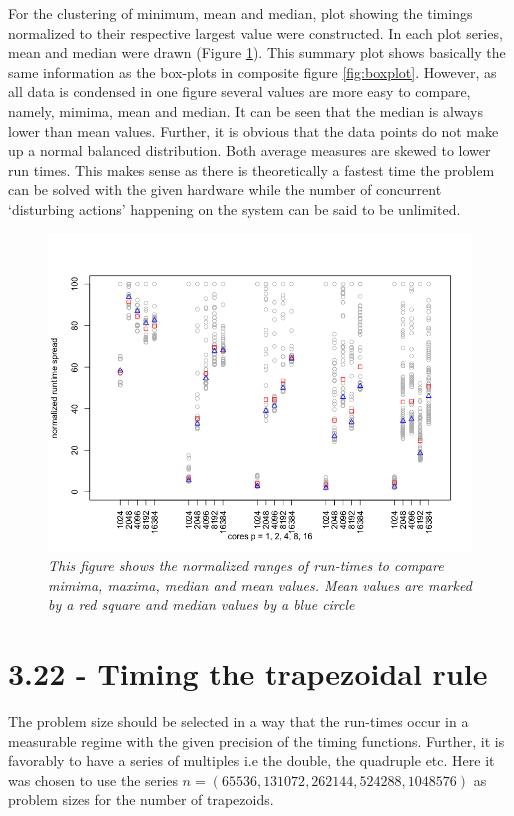 \documentclass[a4paper,11pt,twoside]{article}
\begin{document}
For the clustering of minimum, mean and median, plot showing the timings normalized to their respective largest value were constructed. In each plot series, mean and median were drawn (Figure \ref{fig:spread}). This summary plot shows basically the same information as the box-plots in composite figure \ref{fig:boxplot}. However, as all data is condensed in one figure several values are more easy to compare, namely, mimima, mean and median. It can be seen that the median is always lower than mean values. Further, it is obvious that the data points do not make up a normal balanced distribution. Both average measures are skewed to lower run times. This makes sense as there is theoretically a fastest time the problem can be solved with the given hardware while the number of concurrent `disturbing actions' happening on the system can be said to be unlimited.    

\begin{figure}
  \centering
    \includegraphics[width=1\textwidth]{spread.png}
    \caption{\textit{This figure shows the normalized ranges of run-times to compare mimima, maxima, median and mean values. Mean values are marked by a red square and median values by a blue circle}}
    \label{fig:spread}
\end{figure}


\section{3.22 - Timing the trapezoidal rule}
The problem size should be selected in a way that the run-times occur in a measurable regime with the given precision of the timing functions. Further, it is favorably to have a series of multiples i.e the double, the quadruple etc. Here it was chosen to use the series $n = (65536, 131072, 262144, 524288, 1048576)$ as problem sizes for the number of trapezoids.
\end{document}
